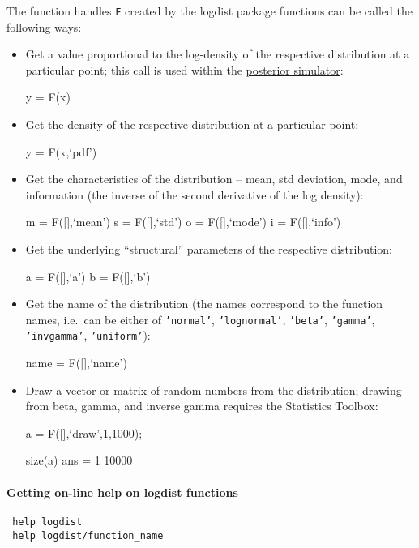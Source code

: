  The function handles \texttt{F} created by the logdist package functions
 can be called the following ways:
 
 \begin{itemize}
 \item
   Get a value proportional to the log-density of the respective
   distribution at a particular point; this call is used within the
   \href{poster/Contents}{posterior simulator}:
 
   y = F(x)
 \item
   Get the density of the respective distribution at a particular point:
 
   y = F(x,`pdf')
 \item
   Get the characteristics of the distribution -- mean, std deviation,
   mode, and information (the inverse of the second derivative of the log
   density):
 
   m = F({[}{]},`mean') s = F({[}{]},`std') o = F({[}{]},`mode') i =
   F({[}{]},`info')
 \item
   Get the underlying ``structural'' parameters of the respective
   distribution:
 
   a = F({[}{]},`a') b = F({[}{]},`b')
 \item
   Get the name of the distribution (the names correspond to the function
   names, i.e.~can be either of \texttt{'normal'}, \texttt{'lognormal'},
   \texttt{'beta'}, \texttt{'gamma'}, \texttt{'invgamma'},
   \texttt{'uniform'}):
 
   name = F({[}{]},`name')
 \item
   Draw a vector or matrix of random numbers from the distribution;
   drawing from beta, gamma, and inverse gamma requires the Statistics
   Toolbox:
 
   a = F({[}{]},`draw',1,1000);
 
   size(a) ans = 1 10000
 \end{itemize}
 
 \paragraph{Getting on-line help on logdist functions}
 
 \begin{verbatim}
 help logdist
 help logdist/function_name
 \end{verbatim}




